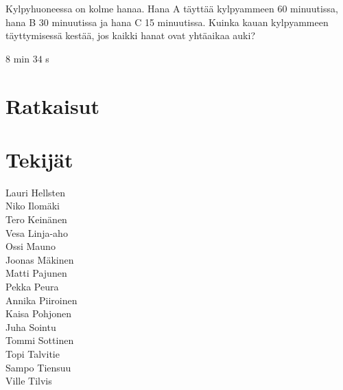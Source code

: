 \begin{tehtava}
Kylpyhuoneessa on kolme hanaa. Hana A täyttää kylpyammeen 60 minuutissa, hana B 30 minuutissa ja hana C 15 minuutissa. Kuinka kauan kylpyammeen täyttymisessä kestää, jos kaikki hanat ovat yhtäaikaa auki?
\begin{vastaus}
$8$ min $34$ s
\end{vastaus}
\end{tehtava}

\chapter{Ratkaisut}


\chapter{Tekijät}

Lauri Hellsten\\
Niko Ilomäki\\
Tero Keinänen\\
Vesa Linja-aho\\
Ossi Mauno\\
Joonas Mäkinen\\
Matti Pajunen\\
Pekka Peura\\
Annika Piiroinen\\
Kaisa Pohjonen\\
Juha Sointu\\
Tommi Sottinen\\
Topi Talvitie\\
Sampo Tiensuu\\
Ville Tilvis